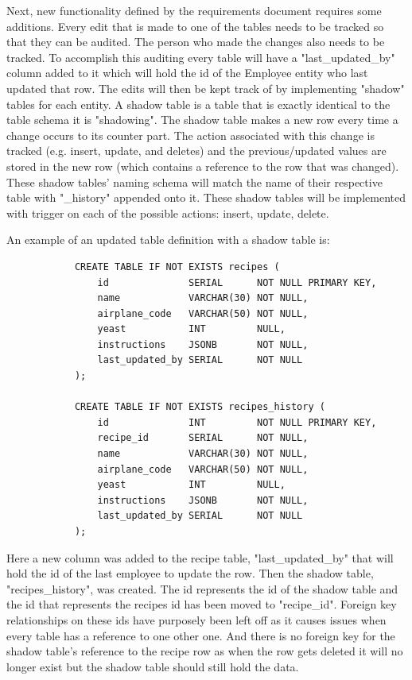         Next, new functionality defined by the requirements document requires some additions.  Every edit that is made to one of the tables needs to be tracked so that they can be audited.  The person who made the changes also needs to be tracked.  To accomplish this auditing every table will have a "last\_updated\_by" column added to it which will hold the id of the Employee entity who last updated that row.  The edits will then be kept track of by implementing "shadow" tables for each entity.  A shadow table is a table that is exactly identical to the table schema it is "shadowing".  The shadow table makes a new row every time a change occurs to its counter part.  The action associated with this change is tracked (e.g. insert, update, and deletes) and the previous/updated values are stored in the new row (which contains a reference to the row that was changed).  These shadow tables' naming schema will match the name of their respective table with "\_history" appended onto it.  These shadow tables will be implemented with trigger on each of the possible actions: insert, update, delete.
        
        An example of an updated table definition with a shadow table is:\\
        
        \begin{verbatim}
            CREATE TABLE IF NOT EXISTS recipes (
                id              SERIAL      NOT NULL PRIMARY KEY,
                name            VARCHAR(30) NOT NULL,
                airplane_code   VARCHAR(50) NOT NULL,
                yeast           INT         NULL,
                instructions    JSONB       NOT NULL,
                last_updated_by SERIAL      NOT NULL
            );
            
            CREATE TABLE IF NOT EXISTS recipes_history (
                id              INT         NOT NULL PRIMARY KEY,
                recipe_id       SERIAL      NOT NULL,
                name            VARCHAR(30) NOT NULL,
                airplane_code   VARCHAR(50) NOT NULL,
                yeast           INT         NULL,
                instructions    JSONB       NOT NULL,
                last_updated_by SERIAL      NOT NULL
            );
        \end{verbatim} 
    
        Here a new column was added to the recipe table, "last\_updated\_by" that will hold the id of the last employee to update the row.  Then the shadow table, "recipes\_history", was created.  The id represents the id of the shadow table and the id that represents the recipes id has been moved to "recipe\_id".  Foreign key relationships on these ids have purposely been left off as it causes issues when every table has a reference to one other one.  And there is no foreign key for the shadow table's reference to the recipe row as when the row gets deleted it will no longer exist but the shadow table should still hold the data.
    
